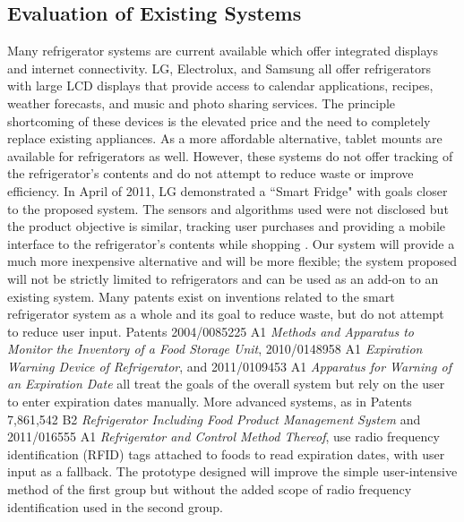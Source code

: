 \documentclass[11pt]{article} %
\begin{document}
\subsection{Evaluation of Existing Systems}
Many refrigerator systems are current available which offer integrated displays and internet connectivity. LG, Electrolux, and Samsung all offer refrigerators with large LCD displays that provide access to calendar applications, recipes, weather forecasts, and music and photo sharing services. The principle shortcoming of these devices is the elevated price and the need to completely replace existing appliances. As a more affordable alternative, tablet mounts are available for refrigerators as well.
However, these systems do not offer tracking of the refrigerator's contents and do not attempt to reduce waste or improve efficiency. In April of 2011, LG demonstrated a ``Smart Fridge" with goals closer to the proposed system. The sensors and algorithms used were not disclosed but the product objective is similar, tracking user purchases and providing a mobile interface to the refrigerator's contents while shopping \cite{lg}. Our system will provide a much more inexpensive alternative and will be more flexible; the system proposed will not be strictly limited to refrigerators and can be used as an add-on to an existing system.
\newline \quad \newline
Many patents exist on inventions related to the smart refrigerator system as a whole and its goal to reduce waste, but do not attempt to reduce user input. Patents 2004/0085225 A1 \emph{Methods and Apparatus to Monitor the Inventory of a Food Storage Unit}, 2010/0148958 A1 \emph{Expiration Warning Device of Refrigerator}, and 2011/0109453 A1 \emph{Apparatus for Warning of an Expiration Date} all treat the goals of the overall system but rely on the user to enter expiration dates manually. More advanced systems, as in Patents 7,861,542 B2 \emph{Refrigerator Including Food Product Management System} and 2011/016555 A1 \emph {Refrigerator and Control Method Thereof}, use radio frequency identification (RFID) tags attached to foods to read expiration dates, with user input as a fallback. The prototype designed will improve the simple user-intensive method of the first group but without the added scope of radio frequency identification used in the second group.
\end{document}
